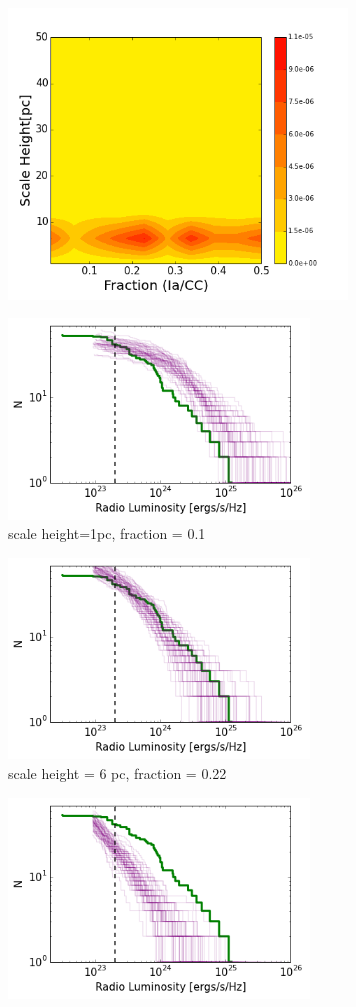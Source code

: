 \documentclass[10pt,a4paper]{article}
\begin{document}
\begin{figure}[h!]
	\begin{subfigure}[b]{0.51\textwidth}
		\includegraphics[width=9cm]{7.png}
		\caption{}
	\end{subfigure}
	\begin{subfigure}[b]{0.5\textwidth}
		\includegraphics[width=8cm]{LumHist_f01d1.png}
		\caption{scale height=1pc, fraction = 0.1}
	\end{subfigure}
	\begin{subfigure}[b]{0.5\textwidth}
		\includegraphics[width=8cm]{LumHist_f022d6.png}
		\caption{scale height = 6 pc, fraction = 0.22}
	\end{subfigure}
	\begin{subfigure}[b]{0.5\textwidth}
		\includegraphics[width=8cm]{LumHist_f30d04.png}

\end{subfigure}
\end{figure}
\end{document}
